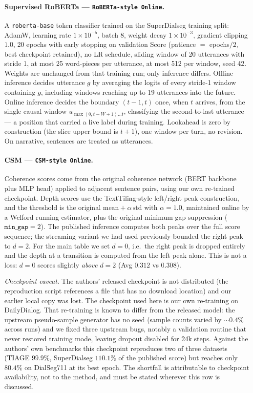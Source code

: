 \paragraph{Supervised RoBERTa \citep{jiang2023superdialseg} ---
\texttt{RoBERTa-style Online}.}
A \texttt{roberta-base} token classifier trained on the SuperDialseg training
split: AdamW, learning rate $1\times10^{-5}$, batch 8, weight decay
$1\times10^{-3}$, gradient clipping $1.0$, 20 epochs with early stopping on
validation Score (patience $=$ epochs$/2$, best checkpoint retained), no LR
schedule, sliding window of 20 utterances with stride 1, at most 25 word-pieces
per utterance, at most 512 per window, seed 42. Weights are unchanged from that
training run; only inference differs. Offline inference decides utterance $g$
by averaging the logits of every stride-1 window containing $g$, including
windows reaching up to 19 utterances into the future. Online inference decides
the boundary $(t-1,t)$ once, when $t$ arrives, from the single causal window
$u_{\max(0,t-W+1)\dots t}$, classifying the second-to-last utterance --- a
position that carried a live label during training. Lookahead is zero by
construction (the slice upper bound is $t+1$), one window per turn, no revision.
On narrative, sentences are treated as utterances.

\paragraph{CSM \citep{xing2021improving} --- \texttt{CSM-style Online}.}
Coherence scores come from the original coherence network (BERT backbone plus
MLP head) applied to adjacent sentence pairs, using our own re-trained
checkpoint. Depth scores use the TextTiling-style left/right peak construction,
and the threshold is the original $\mathrm{mean} + \alpha\,\mathrm{std}$ with
$\alpha=1.0$, maintained online by a Welford running estimator, plus the
original minimum-gap suppression ($\texttt{min\_gap}=2$). The published
inference computes both peaks over the full score sequence; the streaming
variant we had used previously bounded the right peak to $d=2$. For the main
table we set $d=0$, i.e.\ the right peak is dropped entirely and the depth at a
transition is computed from the left peak alone. This is not a loss:
$d{=}0$ scores slightly \emph{above} $d{=}2$ (Avg $0.312$ vs $0.308$).

\emph{Checkpoint caveat.} The authors' released checkpoint is not distributed
(the reproduction script references a file that has no download location) and
our earlier local copy was lost. The checkpoint used here is our own
re-training on DailyDialog. That re-training is known to differ from the
released model: the upstream pseudo-sample generator has no seed (sample counts
varied by $\sim0.4\%$ across runs) and we fixed three upstream bugs, notably a
validation routine that never restored training mode, leaving dropout disabled
for 24k steps. Against the authors' own benchmarks this checkpoint reproduces
two of three datasets (TIAGE $99.9\%$, SuperDialseg $110.1\%$ of the published
score) but reaches only $80.4\%$ on DialSeg711 at its best epoch. The shortfall
is attributable to checkpoint availability, not to the method, and must be
stated wherever this row is discussed.


